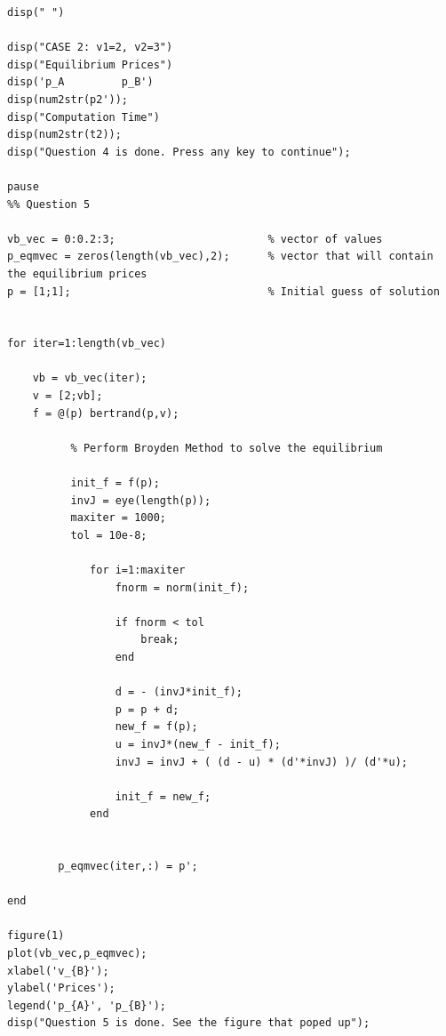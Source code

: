 \documentclass[10pt, letterpaper]{article}
\begin{document}
\begin{verbatim}
disp(" ")

disp("CASE 2: v1=2, v2=3")
disp("Equilibrium Prices")
disp('p_A         p_B')
disp(num2str(p2'));
disp("Computation Time")
disp(num2str(t2));
disp("Question 4 is done. Press any key to continue");

pause
%% Question 5

vb_vec = 0:0.2:3;                        % vector of values 
p_eqmvec = zeros(length(vb_vec),2);      % vector that will contain the equilibrium prices
p = [1;1];                               % Initial guess of solution 


for iter=1:length(vb_vec)   
    
    vb = vb_vec(iter);
    v = [2;vb];
    f = @(p) bertrand(p,v);    
    
          % Perform Broyden Method to solve the equilibrium
          
          init_f = f(p);
          invJ = eye(length(p)); 
          maxiter = 1000;
          tol = 10e-8;
              
             for i=1:maxiter
                 fnorm = norm(init_f);
                 
                 if fnorm < tol
                     break;
                 end
                 
                 d = - (invJ*init_f);
                 p = p + d;
                 new_f = f(p);
                 u = invJ*(new_f - init_f);
                 invJ = invJ + ( (d - u) * (d'*invJ) )/ (d'*u);
                 
                 init_f = new_f;
             end
            
        
        p_eqmvec(iter,:) = p';
    
end

figure(1)
plot(vb_vec,p_eqmvec);
xlabel('v_{B}');
ylabel('Prices');
legend('p_{A}', 'p_{B}');
disp("Question 5 is done. See the figure that poped up");
\end{verbatim}
                     
\end{document}
